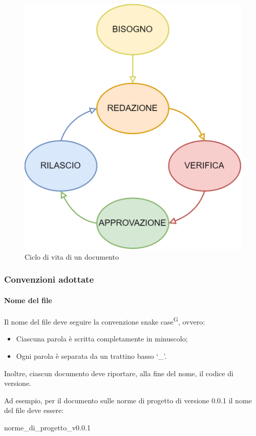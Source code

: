 \begin{figure}[H]
    \centering
    \includegraphics[scale=0.8]{doc_lifecycle.png}
    \caption{Ciclo di vita di un documento}
    \label{fig:doc_lifecycle}
\end{figure}

\subsubsection{Convenzioni adottate}\label{sec:processi_di_supporto:documentazione:convenzioni}
\paragraph{Nome del file}
Il nome del file deve seguire la convenzione snake case\textsuperscript{G}, ovvero:
\begin{itemize}
    \item Ciascuna parola è scritta completamente in minuscolo;
    \item Ogni parola è separata da un trattino basso `\_'.
\end{itemize}
Inoltre, ciascun documento deve riportare, alla fine del nome, il codice di versione.
\par Ad esempio, per il documento sulle norme di progetto di versione 0.0.1 il nome del file deve essere:
\begin{center}
    norme\_di\_progetto\_v0.0.1
\end{center}
